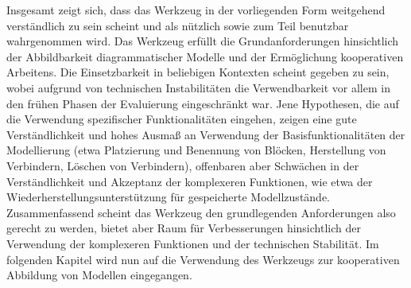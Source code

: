 Insgesamt zeigt sich, dass das Werkzeug in der vorliegenden Form weitgehend verständlich zu sein scheint und als nützlich sowie zum Teil benutzbar wahrgenommen wird. Das Werkzeug erfüllt die Grundanforderungen hinsichtlich der Abbildbarkeit diagrammatischer Modelle und der Ermöglichung kooperativen Arbeitens. Die Einsetzbarkeit in beliebigen Kontexten scheint gegeben zu sein, wobei aufgrund von technischen Instabilitäten die Verwendbarkeit vor allem in den frühen Phasen der Evaluierung eingeschränkt war. Jene Hypothesen, die auf die Verwendung spezifischer Funktionalitäten eingehen, zeigen eine gute Verständlichkeit und hohes Ausmaß an Verwendung der Basisfunktionalitäten der Modellierung (etwa Platzierung und Benennung von Blöcken, Herstellung von Verbindern, Löschen von Verbindern), offenbaren aber Schwächen in der Verständlichkeit und Akzeptanz der komplexeren Funktionen, wie etwa der Wiederherstellungsunterstützung für gespeicherte Modellzustände. Zusammenfassend scheint das Werkzeug den grundlegenden Anforderungen also gerecht zu werden, bietet aber Raum für Verbesserungen hinsichtlich der Verwendung der komplexeren Funktionen und der technischen Stabilität. Im folgenden Kapitel wird nun auf die Verwendung des Werkzeugs zur kooperativen Abbildung von Modellen eingegangen. 

